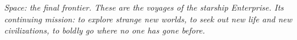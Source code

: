 \emph{Space: the final frontier. These are the voyages of the starship Enterprise. Its continuing mission: to explore strange new worlds,
to seek out new life and new civilizations, to boldly go where no one has gone before.}
